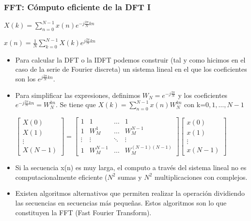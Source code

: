 \begin{frame}
\frametitle{FFT: Cómputo eficiente de la DFT I}

\footnotesize

\hspace{3cm}\alert{$X(k)=\sum_{n=0}^{N-1} x(n) e^{-j\frac{2\pi}{N}kn}$}

\hspace{3cm}\alert{$x(n)=\frac{1}{N}\sum_{k=0}^{N-1} X(k) e^{j\frac{2\pi}{N}kn}$}

\begin{itemize}
\item Para calcular la DFT o la IDFT podemos construir (tal y como hicimos en el caso de la serie de Fourier discreta)  un sistema lineal en el que los coeficientes son los $e^{j\frac{2\pi}{N}kn}$.
\item Para simplificar las expresiones, definimos $W_N=e^{-j\frac{2\pi}{N}}$ y los coeficientes $e^{-j\frac{2\pi}{N}kn}=W_N^{kn}$. Se tiene que $X(k)=\sum_{n=0}^{N-1}x(n)W_N^{kn}$ con k=${0,1,\dots,N-1}$

{\scriptsize
$\left [\begin{array}{c}X(0)\\X(1)\\\vdots\\X(N-1)\end{array}\right ]=\left [\begin{array}{cccc}1& 1 &\dots &1\\ 1 &W_M^{1}& \dots& W_M^{N-1}\\\vdots&\vdots&\ddots & \vdots\\1 & W_M^{N-1} & \dots & W_M^{(N-1)(N-1)} \end{array}\right ]\left [\begin{array}{c}x(0)\\x(1)\\\vdots\\x(N-1)\end{array}\right ]$
}

\item Si la secuencia x(n) es muy larga, el computo a través del sistema lineal no es computacionalmente eficiente ($N^2$ sumas y $N^2$ multiplicaciones con complejos.

\item Existen algoritmos alternativos que permiten realizar la operación dividiendo las secuencias en secuencias más pequeñas. Estos algoritmos son lo que constituyen la \alert{FFT (Fast Fourier Transform)}.


\end{itemize}


\end{frame}


